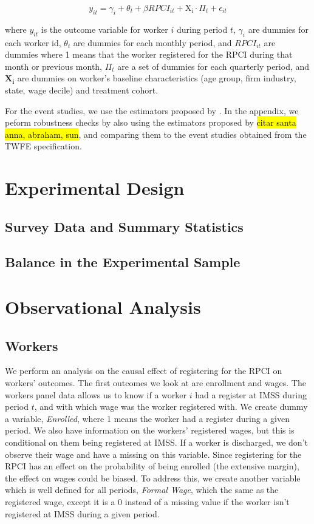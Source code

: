 \documentclass[oneside,11pt]{article}
\begin{document}
$$ y_{it} = \gamma_{i} + \theta_{t}+ \beta RPCI_{it} + \mathrm{X_i}\cdot\Pi_t +\epsilon_{it} $$

where $y_{it}$ is the outcome variable for worker $i$ during period $t$, $\gamma_{i}$ are dummies for each worker id, $\theta_{t}$ are dummies for each monthly period, and $RPCI_{it}$ are dummies where 1 means that the worker registered for the RPCI during that month or previous month, $\Pi_t$ are a set of dummies for each quarterly period, and $\mathbf{X_i}$ are dummies on worker's baseline characteristics (age group, firm industry, state, wage decile) and treatment cohort.

For the event studies, we use the estimators proposed by \cite{de2020two}. In the appendix, we peform robustness checks by also using the estimators proposed by \hl{citar santa anna, abraham, sun}, and comparing them to the event studies obtained from the TWFE specification.

\section{Experimental Design} \label{Experiment}

\subsection{Survey Data and Summary Statistics}

\subsection{Balance in the Experimental Sample}

\section{Observational Analysis} \label{observational}

\subsection{Workers}

We perform an analysis on the causal effect of registering for the RPCI on workers' outcomes. The first outcomes we look at are enrollment and wages. The workers panel data allows us to know if a worker $i$ had a register at IMSS during period $t$, and with which wage was the worker registered with. We create dummy a variable, \textit{Enrolled}, where 1 means the worker had a register during a given period. We also have information on the workers' registered wages, but this is conditional on them being registered at IMSS. If a worker is discharged, we don't observe their wage and have a missing on this variable. Since registering for the RPCI has an effect on the probability of being enrolled (the extensive margin), the effect on wages could be biased. To address this, we create another variable which is well defined for all periods, \textit{Formal Wage}, which the same as the registered wage, except it is a 0 instead of a missing value if the worker isn't registered at IMSS during a given period. 
\end{document}
